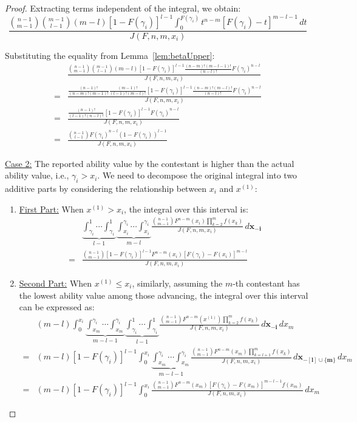 \begin{proof}
Extracting terms independent of the integral, we obtain:
\[
\frac{\binom{n-1}{m-1} \binom{m-1}{l-1} (m-l) [1-F(\gamma_i)]^{l-1} \int_{0}^{F(\gamma_i)} t^{n-m}[F(\gamma_i)-t]^{m-l-1} \, dt}{J(F,n,m,x_i)}
\]

Substituting the equality from Lemma~\ref{lem:betaUpper}:
\[
\begin{aligned}
& \frac{\binom{n-1}{m-1} \binom{m-1}{l-1} (m-l) [1-F(\gamma_i)]^{l-1} \frac{(n-m)!(m-l-1)!}{(n-l)!}F(\gamma_i)^{n-l}}{J(F,n,m,x_i)} \\
= & \frac{\frac{(n-1)!}{(n-m)!(m-1)!} \frac{(m-1)!}{(l-1)!(m-l)!} [1-F(\gamma_i)]^{l-1} \frac{(n-m)!(m-l)!}{(n-l)!}F(\gamma_i)^{n-l}}{J(F,n,m,x_i)} \\
= & \frac{\frac{(n-1)!}{(l-1)!(n-l)!} [1-F(\gamma_i)]^{l-1}F(\gamma_i)^{n-l}}{J(F,n,m,x_i)} \\
= & \frac{\binom{n-1}{l-1}F(\gamma_i)^{n-l}(1-F(\gamma_i))^{l-1}}{J(F,n,m,x_i)}
\end{aligned}
\]

\underline{Case 2:} The reported ability value by the contestant is higher than the actual ability value, i.e., \(\gamma_i > x_i\). We need to decompose the original integral into two additive parts by considering the relationship between \(x_i\) and \(x^{(1)}\):

\begin{enumerate}
\item \underline{First Part:} When \(x^{(1)} > x_i\), the integral over this interval is:
   \[
   \begin{aligned}
       & \underbrace{\int_{\gamma_i}^{1} \cdots \int_{\gamma_i}^{1}}_{l-1} \underbrace{\int_{x_i}^{\gamma_i} \cdots \int_{x_i}^{\gamma_i}}_{m-l} \frac{\binom{n-1}{m-1}F^{n-m}(x_i)\prod_{k=2}^{m}f(x_k)}{J(F,n,m,x_i)} \, d\mathbf{x_{-i}} \\
       = & \frac{\binom{n-1}{m-1}[1-F(\gamma_i)]^{l-1}F^{n-m}(x_i)[F(\gamma_i)-F(x_i)]^{m-l}}{J(F,n,m,x_i)}
   \end{aligned}
   \]
\item \underline{Second Part:} When \(x^{(1)} \leq x_i\), similarly, assuming the \(m\)-th contestant has the lowest ability value among those advancing, the integral over this interval can be expressed as:
   \[
   \begin{aligned}
       & (m-l) \int_{0}^{x_i} \underbrace{\int_{x_m}^{\gamma_i} \cdots \int_{x_m}^{\gamma_i}}_{m-l-1} \underbrace{\int_{\gamma_i}^1 \cdots \int_{\gamma_i}^1}_{l-1} \frac{\binom{n-1}{m-1} F^{n-m}(x^{(1)}) \prod_{k=2}^m f(x_k)}{J(F,n,m,x_i)} \, d\mathbf{x_{-i}} \, dx_m \\
       = & (m-l) [1-F(\gamma_i)]^{l-1} \int_{0}^{x_i} \underbrace{\int_{x_m}^{\gamma_i} \cdots \int_{x_m}^{\gamma_i}}_{m-l-1} \frac{\binom{n-1}{m-1} F^{n-m}(x_m) \prod_{k=l+1}^m f(x_k)}{J(F,n,m,x_i)} \, d\mathbf{x_{-[l]\cup{\{m\}}}} \, dx_m \\
       = & (m-l) [1-F(\gamma_i)]^{l-1} \int_{0}^{x_i} \frac{\binom{n-1}{m-1} F^{n-m}(x_m) [F(\gamma_i) - F(x_m)]^{m-l-1}f(x_m)}{J(F,n,m,x_i)} \, dx_m 
   \end{aligned}
   \]
   

\end{enumerate}
\end{proof}
